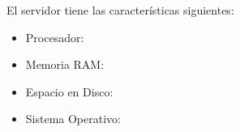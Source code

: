 
El servidor tiene las caracter\'isticas siguientes:
\begin{itemize}
\item Procesador:
\item Memoria RAM:
\item Espacio en Disco:
\item Sistema Operativo:
\end{itemize}

